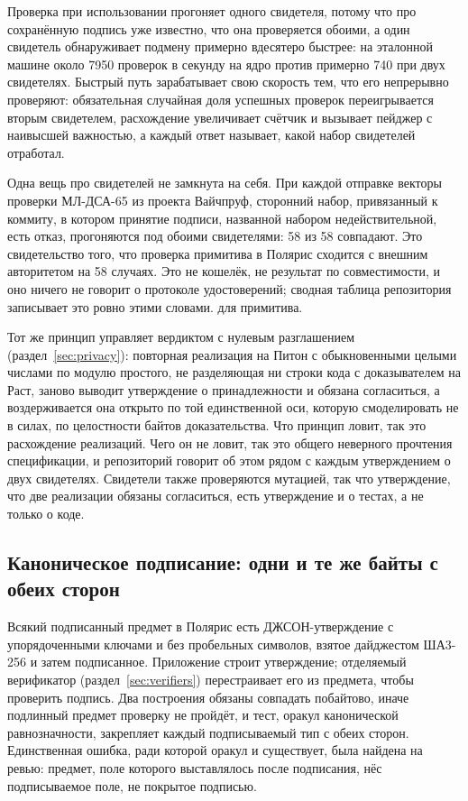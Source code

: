 Проверка при использовании прогоняет одного свидетеля, потому что про сохранённую подпись уже
известно, что она проверяется обоими, а один свидетель обнаруживает подмену примерно вдесятеро
быстрее: на эталонной машине около 7950 проверок в секунду на ядро против примерно 740 при двух
свидетелях. Быстрый путь зарабатывает свою скорость тем, что его непрерывно проверяют:
обязательная случайная доля успешных проверок переигрывается вторым свидетелем, расхождение
увеличивает счётчик и вызывает пейджер с наивысшей важностью, а каждый ответ называет, какой набор
свидетелей отработал. \sImpl

Одна вещь про свидетелей не замкнута на себя. При каждой отправке векторы проверки МЛ-ДСА-65 из
проекта Вайчпруф, сторонний набор, привязанный к коммиту, в котором принятие подписи, названной
набором недействительной, есть отказ, прогоняются под обоими свидетелями: 58 из 58 совпадают. Это
свидетельство того, что проверка примитива в Полярис сходится с внешним авторитетом на 58 случаях.
Это не кошелёк, не результат по совместимости, и оно ничего не говорит о протоколе удостоверений;
сводная таблица репозитория записывает это ровно этими словами. \sWit{} для примитива.

Тот же принцип управляет вердиктом с нулевым разглашением (раздел~\ref{sec:privacy}): повторная
реализация на Питон с обыкновенными целыми числами по модулю простого, не разделяющая ни строки
кода с доказывателем на Раст, заново выводит утверждение о принадлежности и обязана согласиться, а
воздерживается она открыто по той единственной оси, которую смоделировать не в силах, по
целостности байтов доказательства. Что принцип ловит, так это расхождение реализаций. Чего он не
ловит, так это общего неверного прочтения спецификации, и репозиторий говорит об этом рядом с
каждым утверждением о двух свидетелях. Свидетели также проверяются мутацией,
так что утверждение, что две реализации обязаны согласиться, есть утверждение и о тестах, а не
только о коде.

\subsection{Каноническое подписание: одни и те же байты с обеих сторон}

Всякий подписанный предмет в Полярис есть ДЖСОН-утверждение с упорядоченными ключами и без
пробельных символов, взятое дайджестом ША3-256 и затем подписанное. Приложение строит
утверждение; отделяемый верификатор (раздел~\ref{sec:verifiers}) перестраивает его из предмета,
чтобы проверить подпись. Два построения обязаны совпадать побайтово, иначе подлинный предмет
проверку не пройдёт, и тест, оракул канонической равнозначности, закрепляет каждый подписываемый
тип с обеих сторон. Единственная ошибка, ради которой оракул и существует, была найдена на ревью:
предмет, поле  которого выставлялось после подписания, нёс подписываемое поле, не
покрытое подписью. \sImpl

